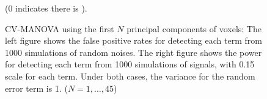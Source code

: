 \documentclass[english]{article}\usepackage[]{graphicx}\usepackage[]{color}
\begin{document}
\begin{figure}[H]
\centering{}(0 indicates there is ).\protect\caption{{\footnotesize{}CV-MANOVA using the first $N$ principal components
of voxels: The left figure shows the false positive rates for detecting
each term from 1000 simulations of random noises. The right figure
shows the power for detecting each term from 1000 simulations of signals,
with 0.15 scale for each term. Under both cases, the variance for
the random error term is 1. ($N=1,\ldots,45$) }{\small{}\label{fig:CV-MANOVA-PCA}}}
\end{figure}
\end{document}
